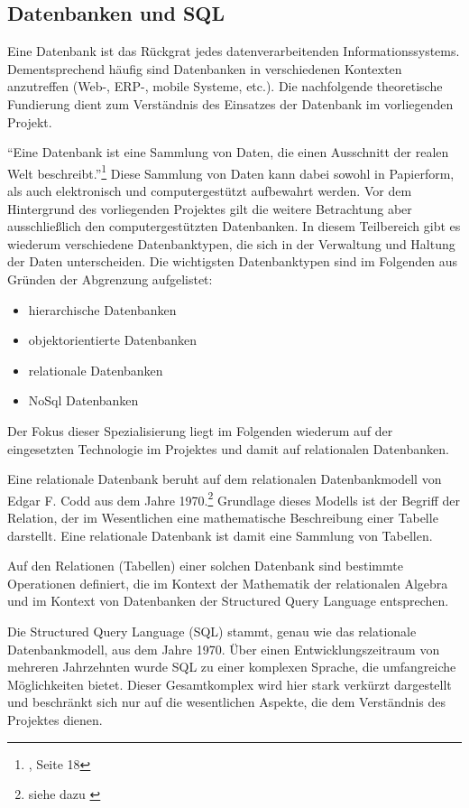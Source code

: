 \subsection{Datenbanken und SQL}
\label{sec:DatenbankenUndSql}

Eine Datenbank ist das Rückgrat jedes datenverarbeitenden Informationssystems. Dementsprechend häufig sind Datenbanken in 
verschiedenen Kontexten anzutreffen (Web-, ERP-, mobile Systeme, etc.). Die nachfolgende theoretische Fundierung dient zum 
Verständnis des Einsatzes der Datenbank im vorliegenden Projekt.

"`Eine Datenbank ist eine Sammlung von Daten, die einen Ausschnitt der realen Welt beschreibt."'\footnote{\citet{elmasri2009}, Seite 18}
Diese
Sammlung von Daten kann dabei sowohl in Papierform, als auch elektronisch und computergestützt aufbewahrt werden. Vor dem 
Hintergrund des vorliegenden Projektes gilt die weitere Betrachtung aber ausschließlich den computergestützten Datenbanken.
In diesem Teilbereich gibt es wiederum verschiedene Datenbanktypen, die sich in der Verwaltung und Haltung der Daten 
unterscheiden. Die wichtigsten Datenbanktypen sind im Folgenden aus Gründen der Abgrenzung aufgelistet:

\begin{itemize}
  \item hierarchische Datenbanken
  \item objektorientierte Datenbanken
  \item relationale Datenbanken
  \item NoSql Datenbanken
\end{itemize}

Der Fokus dieser Spezialisierung liegt im Folgenden wiederum auf der eingesetzten Technologie im Projektes und damit auf 
relationalen Datenbanken. 

Eine relationale Datenbank beruht auf dem relationalen Datenbankmodell von Edgar F. Codd aus dem Jahre 1970.\footnote{siehe dazu \citet{codd1970}} Grundlage dieses Modells ist der Begriff der Relation, der im Wesentlichen
eine mathematische Beschreibung einer Tabelle darstellt. Eine relationale Datenbank ist damit eine Sammlung von Tabellen.

Auf den Relationen (Tabellen) einer solchen Datenbank sind bestimmte Operationen definiert, die im Kontext der Mathematik 
der relationalen Algebra und im Kontext von Datenbanken der Structured Query Language entsprechen.

Die Structured Query Language (SQL) stammt, genau wie das relationale Datenbankmodell, aus dem Jahre 1970. Über einen Entwicklungszeitraum von mehreren Jahrzehnten 
wurde SQL zu einer komplexen Sprache, die umfangreiche Möglichkeiten bietet. Dieser Gesamtkomplex wird hier stark verkürzt
dargestellt und beschränkt sich nur auf die wesentlichen Aspekte, die dem Verständnis des Projektes dienen.

